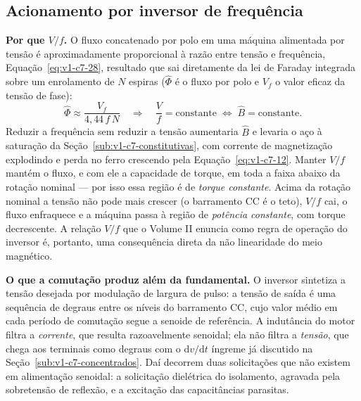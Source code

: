 \documentclass[12pt,a4paper]{article}
\numberwithin{equation}{section}
\numberwithin{table}{section}
\numberwithin{figure}{section}
\begin{document}
\subsection{Acionamento por inversor de frequência}\label{sub:v1-c7-inversor}

\textbf{Por que $V/f$.} O fluxo concatenado por polo em uma máquina alimentada
por tensão é aproximadamente proporcional à razão entre tensão e frequência,
Equação~\eqref{eq:v1-c7-28}, resultado que sai diretamente da lei de Faraday
integrada sobre um enrolamento de $N$ espiras ($\hat{\Phi}$ é o fluxo por
polo e $V_f$ o valor eficaz da tensão de fase):
\begin{equation}\label{eq:v1-c7-28}
\hat{\Phi} \approx \frac{V_{f}}{4{,}44\,f\,N}
\quad\Longrightarrow\quad
\frac{V}{f} = \text{constante} \;\Leftrightarrow\; \hat{B} = \text{constante} .
\end{equation}
Reduzir a frequência sem reduzir a tensão aumentaria $\hat{B}$ e levaria o aço
à saturação da Seção~\ref{sub:v1-c7-constitutivas}, com corrente de
magnetização explodindo e perda no ferro crescendo pela
Equação~\eqref{eq:v1-c7-12}. Manter $V/f$ mantém o fluxo, e com ele a
capacidade de torque, em toda a faixa abaixo da rotação nominal --- por isso
essa região é de \emph{torque constante}. Acima da rotação nominal a tensão não
pode mais crescer (o barramento CC é o teto), $V/f$ cai, o fluxo enfraquece e a
máquina passa à região de \emph{potência constante}, com torque decrescente.
A relação $V/f$ que o Volume II enuncia como regra de operação do inversor é,
portanto, uma consequência direta da não linearidade do meio magnético.

\textbf{O que a comutação produz além da fundamental.} O inversor sintetiza a
tensão desejada por modulação de largura de pulso: a tensão de saída é uma
sequência de degraus entre os níveis do barramento CC, cujo valor médio em cada
período de comutação segue a senoide de referência. A indutância do motor
filtra a \emph{corrente}, que resulta razoavelmente senoidal; ela não filtra a
\emph{tensão}, que chega aos terminais como degraus com o
$\mathrm{d}v/\mathrm{d}t$ íngreme já discutido na
Seção~\ref{sub:v1-c7-concentrados}. Daí decorrem duas solicitações que não
existem em alimentação senoidal: a solicitação dielétrica do isolamento, agravada
pela sobretensão de reflexão, e a excitação das capacitâncias parasitas.
\end{document}
